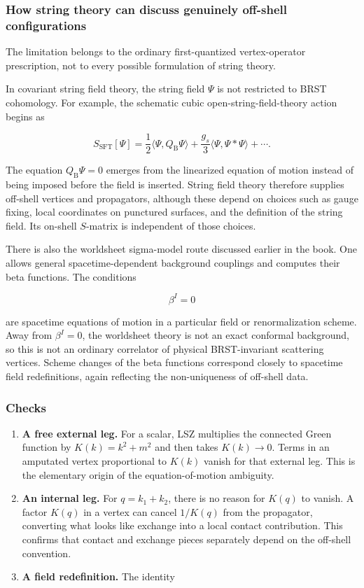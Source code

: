 \documentclass[
  10pt,
  a4paper,
  openany]{book}
\begin{document}
\subsubsection{How string theory can discuss genuinely off-shell
configurations}\label{how-string-theory-can-discuss-genuinely-off-shell-configurations}

The limitation belongs to the ordinary first-quantized vertex-operator
prescription, not to every possible formulation of string theory.

In covariant string field theory, the string field \(\Psi\) is not
restricted to BRST cohomology. For example, the schematic cubic
open-string-field-theory action begins as

\[
S_{\mathrm{SFT}}[\Psi]
=\frac12\langle\Psi,Q_{\mathrm B}\Psi\rangle
+\frac{g_s}{3}\langle\Psi,\Psi*\Psi\rangle
+\cdots.
\]

The equation \(Q_{\mathrm B}\Psi=0\) emerges from the linearized
equation of motion instead of being imposed before the field is
inserted. String field theory therefore supplies off-shell vertices and
propagators, although these depend on choices such as gauge fixing,
local coordinates on punctured surfaces, and the definition of the
string field. Its on-shell \(S\)-matrix is independent of those choices.

There is also the worldsheet sigma-model route discussed earlier in the
book. One allows general spacetime-dependent background couplings and
computes their beta functions. The conditions

\[
\beta^I=0
\]

are spacetime equations of motion in a particular field or
renormalization scheme. Away from \(\beta^I=0\), the worldsheet theory
is not an exact conformal background, so this is not an ordinary
correlator of physical BRST-invariant scattering vertices. Scheme
changes of the beta functions correspond closely to spacetime field
redefinitions, again reflecting the non-uniqueness of off-shell data.

\subsubsection{Checks}\label{checks-26}

\begin{enumerate}
\def\labelenumi{\arabic{enumi}.}
\item
  \textbf{A free external leg.} For a scalar, LSZ multiplies the
  connected Green function by \(K(k)=k^2+m^2\) and then takes
  \(K(k)\to0\). Terms in an amputated vertex proportional to \(K(k)\)
  vanish for that external leg. This is the elementary origin of the
  equation-of-motion ambiguity.
\item
  \textbf{An internal leg.} For \(q=k_1+k_2\), there is no reason for
  \(K(q)\) to vanish. A factor \(K(q)\) in a vertex can cancel
  \(1/K(q)\) from the propagator, converting what looks like exchange
  into a local contact contribution. This confirms that contact and
  exchange pieces separately depend on the off-shell convention.
\item
  \textbf{A field redefinition.} The identity
\end{enumerate}
\end{document}
